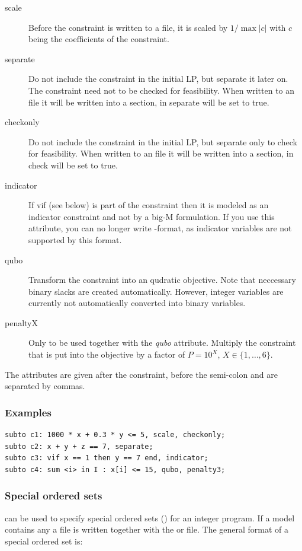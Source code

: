 \begin{description}
\item[scale]
  Before the constraint is written to a file, it is scaled by
  $1/\max |c|$ with $c$ being the coefficients of the constraint.
\item[separate]
  Do not include the constraint in the initial LP, but separate it later on.
  The constraint need not to be checked for feasibility.
  When written to an \lpf file it will be written into a  section, in \scip separate will be set to true.
\item[checkonly]
  Do not include the constraint in the initial LP, but separate only to
  check for feasibility.
  When written to an \lpf file it will be written into a  section, in \scip check will be set to true.
\item[indicator]
  If vif (see below) is part of the constraint then it is modeled as an
  indicator constraint and not by a big-M formulation.
  If you use this attribute, you can no longer write \mps-format, as
  indicator variables are not supported by this format.
\item[qubo]
  Transform the constraint into an qudratic objective.
  Note that neccessary binary slacks are created automatically.
  However, integer variables are currently not automatically
  converted into binary variables.
\item[penaltyX] Only to be used together with the \emph{qubo}
attribute. Multiply the constraint that is put into the objective
by a factor of $P=10^X$, $X\in\{1,\ldots,6\}$.
\end{description}

\noindent
The attributes are given after the constraint, before the semi-colon
and are separated by commas.

\subsubsection{Examples}
{\small
\begin{verbatim}
subto c1: 1000 * x + 0.3 * y <= 5, scale, checkonly;
subto c2: x + y + z == 7, separate;
subto c3: vif x == 1 then y == 7 end, indicator;
subto c4: sum <i> in I : x[i] <= 15, qubo, penalty3;
\end{verbatim}
}


\subsubsection{Special ordered sets}
\zimpl can be used to specify special ordered sets (\sos) for an
integer program. If a model contains any \sos a  file is
written together with the  or  file.
The general format of a special ordered set is:

